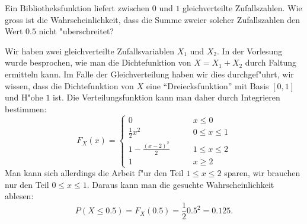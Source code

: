 Ein Bibliotheksfunktion liefert zwischen $0$ und $1$ gleichverteilte
Zufallszahlen. Wie gross ist die Wahrscheinlichkeit, dass die Summe
zweier solcher Zufallszahlen den Wert $0.5$ nicht "uberschreitet?

\begin{loesung}
Wir haben zwei gleichverteilte Zufallsvariablen $X_1$ und $X_2$. 
In der Vorlesung wurde besprochen, wie man die Dichtefunktion
von $X=X_1+X_2$ durch Faltung ermitteln kann.
Im Falle der Gleichverteilung haben wir dies durchgef"uhrt,
wir wissen, dass die Dichtefunktion von $X$
eine ``Dreiecksfunktion'' mit Basis $[0,1]$ und H"ohe $1$ ist.
Die Verteilungsfunktion kann man daher durch Integrieren bestimmen:
\[
F_X(x)=\begin{cases}
0&\qquad x\le 0\\
\frac12x^2&\qquad 0\le x\le 1\\
1-\frac{(x-2)^2}2&\qquad1\le x\le 2\\
1&\qquad x\ge 2
\end{cases}
\]
Man kann sich allerdings die Arbeit f"ur den Teil $1\le x\le 2$ sparen,
wir brauchen nur den Teil $0\le x\le 1$.
Daraus kann man die gesuchte Wahrscheinlichkeit ablesen:
\[
P(X\le 0.5)=F_X(0.5)=\frac120.5^2=0.125.
\]
\end{loesung}

